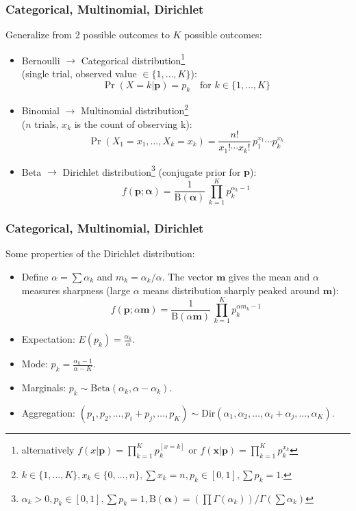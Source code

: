 \documentclass[ignorenonframetext]{beamer}
\begin{document}
\begin{frame}\frametitle{Categorical, Multinomial, Dirichlet}
Generalize from 2 possible outcomes to $K$ possible outcomes:
\begin{itemize}
\item Bernoulli $\rightarrow$ Categorical distribution\footnote{
  alternatively $f(x|\mathbf{p})=\prod_{k=1}^K p_k^{[x=k]}$ or
  $f(\mathbf{x}|\mathbf{p})=\prod_{k=1}^K p_k^{x_k}$} 
\\(single trial, observed value $\in \{1,\dots, K\}$): \[ 
\Pr(X=k| \mathbf{p} ) = p_k\!\quad \text{for }k\in\{1,\ldots,K\}
\]

\item Binomial $\rightarrow$ Multinomial distribution\footnote{
$k\in\{1,\dots,K\}, x_k\in\{0,\dots,n\}, \sum x_k=n, p_k\in[0,1], \sum
  p_k = 1$.
}
\\($n$ trials, $x_k$ is the count of observing k):\[
\Pr(X_1 = x_1, \dots, X_k = x_k) = 
\frac{n!}{x_1!\cdots x_k!}\,p_1^{x_1}\cdots p_k^{x_k}
\]

\item Beta $\rightarrow$ Dirichlet distribution\footnote{$
\alpha_k>0, p_k\in[0,1], \sum p_k=1, 
\mbox{B}(\boldsymbol{\alpha}) = 
\left(\prod \Gamma(\alpha_k)\right)/\Gamma\left(\sum \alpha_k\right)
$}
(conjugate prior for $\mathbf{p}$):\[
f(\mathbf{p};\boldsymbol{\alpha}) = \frac{1}{\mbox{B}(\boldsymbol{\alpha})}\,
\prod_{k=1}^K p_k^{\alpha_k-1}
\]
\end{itemize}
\end{frame}

\begin{frame}\frametitle{Categorical, Multinomial, Dirichlet}
Some properties of the Dirichlet distribution:
\begin{itemize}
\item Define $\alpha = \sum \alpha_k$ and $m_k = \alpha_k / \alpha$.
  The vector $\mathbf{m}$ gives the mean and $\alpha$ measures
  sharpness (large $\alpha$ means distribution sharply peaked around
  $\mathbf{m}$): \[ f(\mathbf{p};\alpha \mathbf{m}) =
  \frac{1}{\mbox{B}(\alpha \mathbf{m})}\, \prod_{k=1}^K p_k^{\alpha
    m_k-1}
\]
\item Expectation: $E(p_k) = \frac{\alpha_k}{\alpha}$.

\item Mode: $p_k = \frac{\alpha_k - 1}{\alpha - K}$.

\item Marginals: $p_k \sim \mbox{Beta}(\alpha_k, \alpha - \alpha_k)$.

\item Aggregation: $(p_1,p_2,\ldots,p_i+p_j,\ldots,p_K) \sim 
\mbox{Dir}(\alpha_1,\alpha_2,\ldots,\alpha_i+\alpha_j,\ldots,\alpha_K)$.
\end{itemize}
\end{frame}
\end{document}

